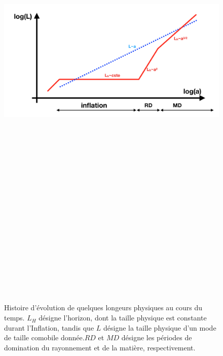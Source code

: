 \begin{figure}[htbp]
	\centering
		\includegraphics[height=25cm]{figs/inflation.png}
	\caption[Histoire d'évolution de quelques longeurs physiques au cours du temps.]{Histoire d'évolution de quelques longeurs physiques au cours du temps. $L_H$ désigne l'horizon, dont la taille physique est constante durant l'Inflation, tandis que $L$ désigne la taille physique d'un mode de taille comobile donnée.$RD$ et $MD$ désigne les périodes de domination du rayonnement et de la matière, respectivement. }
	\label{f:inflation}
\end{figure}

